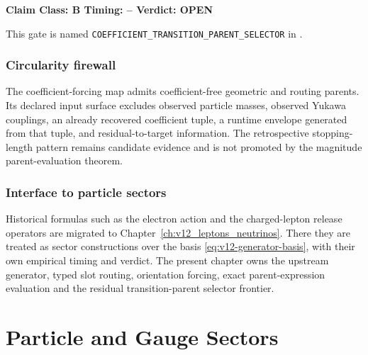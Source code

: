 \documentclass[11pt,a4paper,twoside]{book}
\theoremstyle{definition}
\newcommand{\vTwelveStatus}[3]{\par\noindent\textbf{Claim Class: #1 \quad Timing: #2 \quad Verdict: #3}\par}
\begin{document}
\vTwelveStatus{B}{--}{OPEN}
This gate is named \texttt{COEFFICIENT\_TRANSITION\_PARENT\_SELECTOR} in
.

\section{Circularity firewall}
The coefficient-forcing map admits coefficient-free geometric and routing
parents. Its declared input surface excludes observed particle masses,
observed Yukawa couplings, an already recovered coefficient tuple, a runtime
envelope generated from that tuple, and residual-to-target information. The
retrospective stopping-length pattern remains candidate evidence and is not
promoted by the magnitude parent-evaluation theorem.

\section{Interface to particle sectors}
Historical formulas such as the electron action and the charged-lepton release
operators are migrated to Chapter~\ref{ch:v12_leptons_neutrinos}. There they
are treated as sector constructions over the basis
\eqref{eq:v12-generator-basis}, with their own empirical timing and verdict.
The present chapter owns the upstream generator, typed slot routing, orientation
forcing, exact parent-expression evaluation and the residual transition-parent
selector frontier.

\clearpage





\part{Particle and Gauge Sectors}

\end{document}
